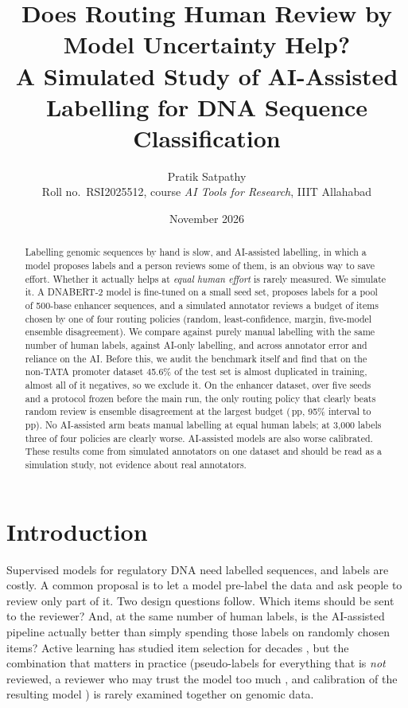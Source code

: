 \documentclass[11pt]{article}
\title{Does Routing Human Review by Model Uncertainty Help?\\ A Simulated Study of AI-Assisted Labelling for DNA Sequence Classification}
\author{Pratik Satpathy\\ \small Roll no.\ RSI2025512, course \emph{AI Tools for Research}, IIIT Allahabad}
\date{November 2026}
\newcommand{\pp}{\,pp}
\begin{document}
\maketitle

\begin{abstract}
Labelling genomic sequences by hand is slow, and AI-assisted labelling, in which a model proposes labels and a person reviews some of them, is an obvious way to save effort. Whether it actually helps at \emph{equal human effort} is rarely measured. We simulate it. A DNABERT-2 model is fine-tuned on a small seed set, proposes labels for a pool of 500-base enhancer sequences, and a simulated annotator reviews a budget of items chosen by one of four routing policies (random, least-confidence, margin, five-model ensemble disagreement). We compare against purely manual labelling with the same number of human labels, against AI-only labelling, and across annotator error and reliance on the AI. Before this, we audit the benchmark itself and find that on the non-TATA promoter dataset 45.6\% of the test set is almost duplicated in training, almost all of it negatives, so we exclude it. On the enhancer dataset, over five seeds and a protocol frozen before the main run, the only routing policy that clearly beats random review is ensemble disagreement at the largest budget (\EnsVsRandMean\pp, 95\% interval \EnsVsRandLo{} to \EnsVsRandHi\pp). No AI-assisted arm beats manual labelling at equal human labels; at 3,000 labels three of four policies are clearly worse. AI-assisted models are also worse calibrated. These results come from simulated annotators on one dataset and should be read as a simulation study, not evidence about real annotators.
\end{abstract}

\section{Introduction}
Supervised models for regulatory DNA need labelled sequences, and labels are costly. A common proposal is to let a model pre-label the data and ask people to review only part of it. Two design questions follow. Which items should be sent to the reviewer? And, at the same number of human labels, is the AI-assisted pipeline actually better than simply spending those labels on randomly chosen items? Active learning has studied item selection for decades \citep{settles2009,seung1992qbc}, but the combination that matters in practice (pseudo-labels for everything that is \emph{not} reviewed, a reviewer who may trust the model too much \citep{parasuraman2010}, and calibration of the resulting model \citep{guo2017calibration}) is rarely examined together on genomic data.
\end{document}

